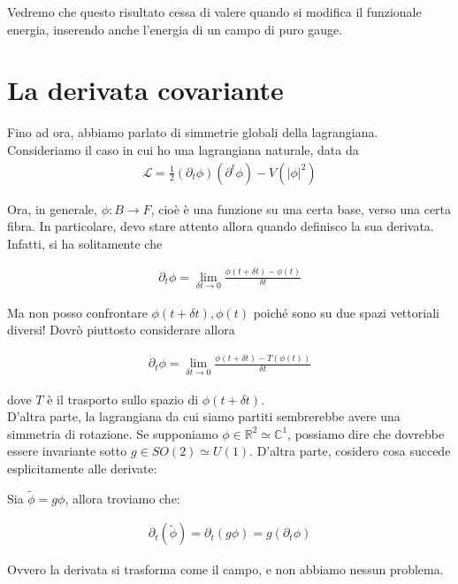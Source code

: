 \documentclass{report}
\begin{document}
Vedremo che questo risultato cessa di valere quando si modifica il funzionale energia, inserendo anche l'energia di un campo di puro gauge. 




\section{La derivata covariante}

Fino ad ora, abbiamo parlato di simmetrie globali della lagrangiana. Consideriamo il caso in cui ho una lagrangiana naturale, data da 
\begin{align}
    \mathcal{L} = \frac{1}{2}(\partial_t \phi)(\partial^t \phi) - V(|\phi|^2)
\end{align}

Ora, in generale, \(\phi : B \rightarrow F\), cioè è una funzione su una certa base, verso una certa fibra. In particolare, devo stare attento allora quando definisco la sua derivata. Infatti, si ha solitamente che 

\begin{align}
    \partial_t \phi = \lim_{\delta t \rightarrow 0}\frac{\phi(t+\delta t) - \phi(t)}{\delta t}
\end{align}

Ma non posso confrontare \(\phi(t+\delta t), \phi(t)\) poiché sono su due spazi vettoriali diversi! Dovrò piuttosto considerare allora 

\begin{align}
    \partial_t \phi = \lim_{\delta t \rightarrow 0}\frac{\phi(t+\delta t) - T(\phi(t))}{\delta t}
\end{align}

dove \(T\) è il trasporto sullo spazio di \(\phi(t+\delta t)\). \\

D'altra parte, la lagrangiana da cui siamo partiti sembrerebbe avere una simmetria di rotazione. Se supponiamo \(\phi \in \mathbb{R}^2 \simeq \mathbb{C}^1\), possiamo dire che dovrebbe essere invariante sotto \(g \in SO(2) \simeq U(1)\). D'altra parte, cosidero cosa succede esplicitamente alle derivate: 

Sia \(\tilde{\phi} = g\phi\), allora troviamo che: 

\begin{align}
    \partial_t(\tilde{\phi}) = \partial_t (g\phi)=  g (\partial_t \phi)
\end{align}

Ovvero la derivata si trasforma come il campo, e non abbiamo nessun problema. \\
\end{document}
